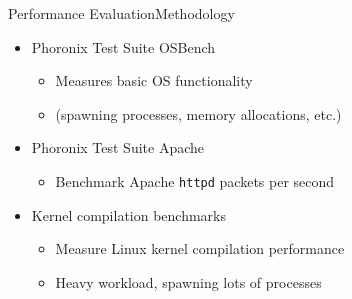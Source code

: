 \documentclass[12pt, dvipsnames]{beamer}
\begin{document}
%


\begin{frame}[c]{Performance Evaluation}{Methodology}
\begin{itemize}
    \item Phoronix Test Suite OSBench
    \begin{itemize}
        \item Measures basic OS functionality
        \item (spawning processes, memory allocations, etc.)
    \end{itemize}

    \vfill
    \item Phoronix Test Suite Apache
    \begin{itemize}
        \item Benchmark Apache \texttt{httpd} packets per second
    \end{itemize}

    \vfill
    \item Kernel compilation benchmarks
    \begin{itemize}
        \item Measure Linux kernel compilation performance
        \item Heavy workload, spawning lots of processes
    \end{itemize}
\end{itemize}
\end{frame}
\end{document}
